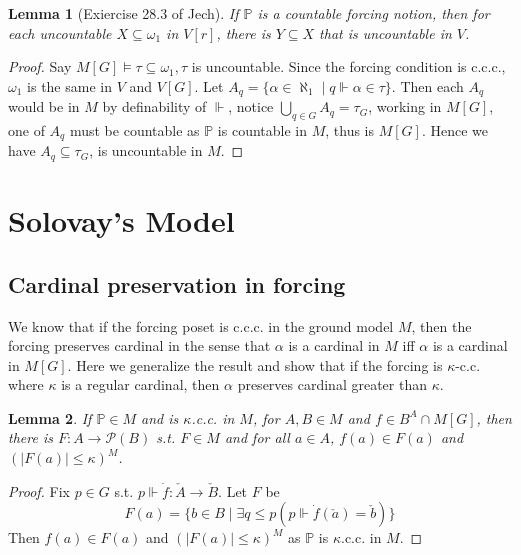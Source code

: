 \documentclass{article}
\newtheorem{lemma}{Lemma}
\newcommand{\bbP}{\mathbb{P}}
\begin{document}
\begin{lemma}[Exiercise 28.3 of Jech]\label{lem:uncountable_subset}
    If $\mathbb{P}$ is a countable forcing notion, then for each uncountable $X\subseteq \omega_1$ in $V[r]$, there is $Y\subseteq X$ that is uncountable in $V$.
\end{lemma}


\begin{proof}
    Say $M[G]\models \tau \subseteq \omega_1, \tau$ is uncountable. Since the forcing condition is c.c.c., $\omega_1$ is the same in $V$ and $V[G]$. Let $A_q = \{\alpha\in \aleph_1\mid q\Vdash \alpha\in \tau\}$. Then each $A_q$ would be in $M$ by definability of $\Vdash$, notice $\bigcup_{q\in G}A_q = \tau_G$, working in $M[G]$, one of $A_q$ must be countable as $\mathbb{P}$ is countable in $M$, thus is $M[G]$. Hence we have $A_q\subseteq \tau_G$, is uncountable in $M$.

\end{proof}

\section{Solovay's Model}

\subsection{Cardinal preservation in forcing}

We know that if the forcing poset is c.c.c. in the ground model $M$, then the forcing preserves cardinal in the sense that $\alpha$ is a cardinal in $M$ iff $\alpha$ is a cardinal in $M[G]$. Here we generalize the result and show that if the forcing is $\kappa$-c.c. where $\kappa$ is a regular cardinal, then $\alpha$ preserves cardinal greater than $\kappa$.

\begin{lemma}
    If $\bbP\in M$ and is $\kappa$.c.c. in $M$, for $A,B\in M$ and $f\in B^A\cap M[G]$, then there is $F:A\to \mathcal{P}(B)$ s.t. $F\in M$ and for all $a\in A$, $f(a)\in F(a)$ and $(|F(a)|\leq \kappa)^M$.
\end{lemma}

\begin{proof}
    Fix $p\in G$ s.t. $p\Vdash \dot{f}:\check{A}\to \check{B}$. Let $F$ be $$F(a) = \{b\in B\mid \exists q\leq p(p\Vdash \dot{f}(\check{a}) = \check{b})\}$$
    Then $f(a)\in F(a)$ and $(|F(a)|\leq \kappa)^M$ as $\bbP$ is $\kappa$.c.c. in $M$. 
\end{proof}
\end{document}
